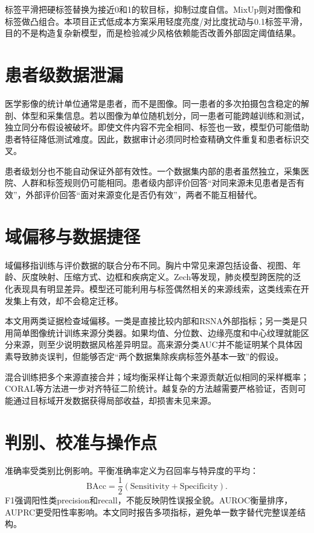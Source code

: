 标签平滑把硬标签替换为接近0和1的软目标，抑制过度自信。MixUp则对图像和标签做凸组合\cite{zhang2018mixup}。本项目正式低成本方案采用轻度亮度/对比度扰动与0.1标签平滑，目的不是构造复杂新模型，而是检验减少风格依赖能否改善外部固定阈值结果。

\section{患者级数据泄漏}

医学影像的统计单位通常是患者，而不是图像。同一患者的多次拍摄包含稳定的解剖、体型和采集信息。若以图像为单位随机划分，同一患者可能跨越训练和测试，独立同分布假设被破坏。即使文件内容不完全相同、标签也一致，模型仍可能借助患者特征降低测试难度。因此，数据审计必须同时检查精确文件重复和患者标识交叉。

患者级划分也不能自动保证外部有效性。一个数据集内部的患者虽然独立，采集医院、人群和标签规则仍可能相同。患者级内部评价回答“对同来源未见患者是否有效”，外部评价回答“面对来源变化是否仍有效”，两者不能互相替代。

\section{域偏移与数据捷径}

域偏移指训练与评价数据的联合分布不同。胸片中常见来源包括设备、视图、年龄、灰度映射、压缩方式、边框和疾病定义。Zech等发现，肺炎模型跨医院的泛化表现具有明显差异\cite{zech2018}。模型还可能利用与标签偶然相关的来源线索，这类线索在开发集上有效，却不会稳定迁移。

本文用两类证据检查域偏移。一类是直接比较内部和RSNA外部指标；另一类是只用简单图像统计训练来源分类器。如果均值、分位数、边缘亮度和中心纹理就能区分来源，则至少说明数据风格差异明显。高来源分类AUC并不能证明某个具体因素导致肺炎误判，但能够否定“两个数据集除疾病标签外基本一致”的假设。

混合训练把多个来源直接合并；域均衡采样让每个来源贡献近似相同的采样概率；CORAL等方法进一步对齐特征二阶统计\cite{sun2016coral}。越复杂的方法越需要严格验证，否则可能通过目标域开发数据获得局部收益，却损害未见来源。

\section{判别、校准与操作点}

准确率受类别比例影响。平衡准确率定义为召回率与特异度的平均：
\begin{equation}
\mathrm{BAcc}=\frac{1}{2}(\mathrm{Sensitivity}+\mathrm{Specificity}).
\end{equation}
F1强调阳性类precision和recall，不能反映阴性误报全貌。AUROC衡量排序，AUPRC更受阳性率影响。本文同时报告多项指标，避免单一数字替代完整误差结构。

